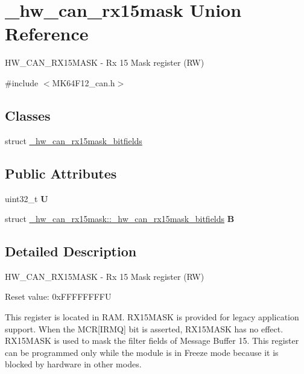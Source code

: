 \hypertarget{union__hw__can__rx15mask}{}\section{\+\_\+hw\+\_\+can\+\_\+rx15mask Union Reference}
\label{union__hw__can__rx15mask}


H\+W\+\_\+\+C\+A\+N\+\_\+\+R\+X15\+M\+A\+SK -\/ Rx 15 Mask register (RW)  




{\ttfamily \#include $<$M\+K64\+F12\+\_\+can.\+h$>$}

\subsection*{Classes}
\begin{DoxyCompactItemize}
\item 
struct \hyperlink{struct__hw__can__rx15mask_1_1__hw__can__rx15mask__bitfields}{\+\_\+hw\+\_\+can\+\_\+rx15mask\+\_\+bitfields}
\end{DoxyCompactItemize}
\subsection*{Public Attributes}
\begin{DoxyCompactItemize}
\item 
uint32\+\_\+t {\bfseries U}\hypertarget{union__hw__can__rx15mask_af22e4158b2ee86328bdbb3a5a3efc9d5}{}\label{union__hw__can__rx15mask_af22e4158b2ee86328bdbb3a5a3efc9d5}

\item 
struct \hyperlink{struct__hw__can__rx15mask_1_1__hw__can__rx15mask__bitfields}{\+\_\+hw\+\_\+can\+\_\+rx15mask\+::\+\_\+hw\+\_\+can\+\_\+rx15mask\+\_\+bitfields} {\bfseries B}\hypertarget{union__hw__can__rx15mask_ade8a5870ffc0005e6645fd3358920867}{}\label{union__hw__can__rx15mask_ade8a5870ffc0005e6645fd3358920867}

\end{DoxyCompactItemize}


\subsection{Detailed Description}
H\+W\+\_\+\+C\+A\+N\+\_\+\+R\+X15\+M\+A\+SK -\/ Rx 15 Mask register (RW) 

Reset value\+: 0x\+F\+F\+F\+F\+F\+F\+F\+FU

This register is located in R\+AM. R\+X15\+M\+A\+SK is provided for legacy application support. When the M\+CR\mbox{[}I\+R\+MQ\mbox{]} bit is asserted, R\+X15\+M\+A\+SK has no effect. R\+X15\+M\+A\+SK is used to mask the filter fields of Message Buffer 15. This register can be programmed only while the module is in Freeze mode because it is blocked by hardware in other modes. 

